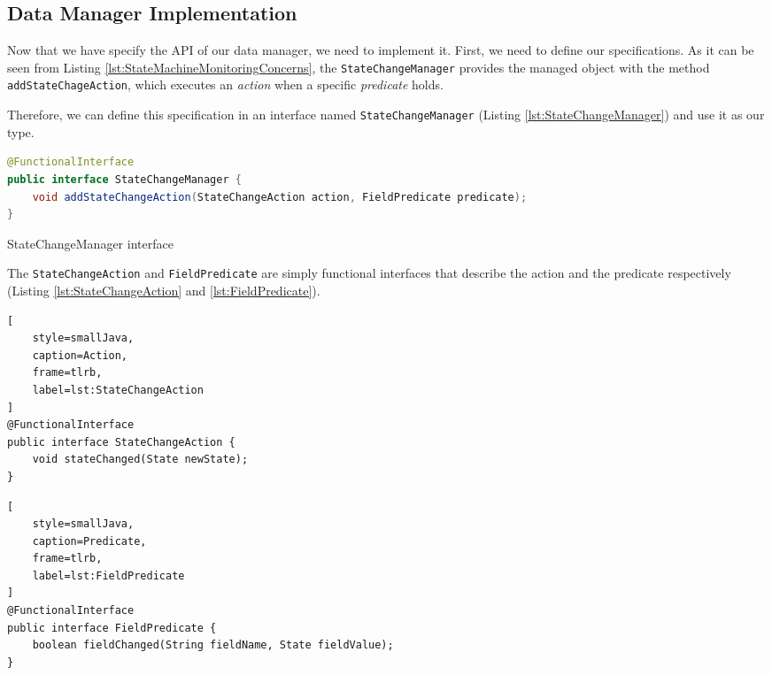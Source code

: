 \subsection{Data Manager Implementation}
Now that we have specify the API of our data manager, we need to implement it.
First, we need to define our specifications.
As it can be seen from Listing \ref{lst:StateMachineMonitoringConcerns}, the \texttt{StateChangeManager} provides the managed object with the method \texttt{addStateChageAction}, which executes an \textit{action} when a specific \textit{predicate} holds.

Therefore, we can define this specification in an interface named \texttt{StateChangeManager} (Listing \ref{lst:StateChangeManager}) and use it as our type.

\begin{sourcecode} [H]
	\begin{lstlisting}[language=Java, escapechar=|]
@FunctionalInterface
public interface StateChangeManager {
	void addStateChangeAction(StateChangeAction action, FieldPredicate predicate);
}
	\end{lstlisting}
	\caption{StateChangeManager interface}
	\label{lst:StateChangeManager}
\end{sourcecode}

The \texttt{StateChangeAction} and \texttt{FieldPredicate} are simply functional interfaces that describe the action and the predicate respectively (Listing \ref{lst:StateChangeAction} and \ref{lst:FieldPredicate}).


\noindent\begin{minipage}{.45\textwidth}
\begin{lstlisting}[
	style=smallJava,
	caption=Action,
	frame=tlrb,
	label=lst:StateChangeAction
]
@FunctionalInterface
public interface StateChangeAction {
	void stateChanged(State newState);
}
\end{lstlisting}

\end{minipage}\hfill
\begin{minipage}{.50\textwidth}
\begin{lstlisting}[
	style=smallJava,
	caption=Predicate,
	frame=tlrb,
	label=lst:FieldPredicate
]
@FunctionalInterface
public interface FieldPredicate {
	boolean fieldChanged(String fieldName, State fieldValue);
}
	\end{lstlisting}
\end{minipage}

